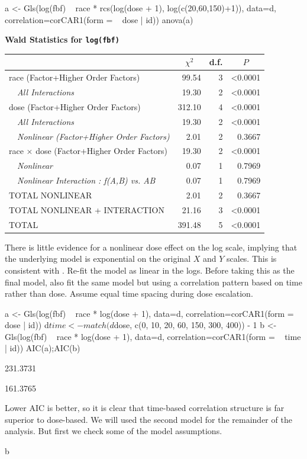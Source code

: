 \begin{Sinput}
a <- Gls(log(fbf) ~ race * rcs(log(dose + 1), log(c(20,60,150)+1)), data=d,
         correlation=corCAR1(form = ~ dose | id))
anova(a)
\end{Sinput}
\textbf{\Needspace{2in}
Wald Statistics for \texttt{\smaller log(fbf)}}\begin{center}
\begin{tabular}{lrrr}
\hline\hline
\multicolumn{1}{l}{}&\multicolumn{1}{c}{$\chi^{2}$}&\multicolumn{1}{c}{d.f.}&\multicolumn{1}{c}{$P$}\tabularnewline
\hline
race  (Factor+Higher Order Factors)& 99.54&3&\textless 0.0001\tabularnewline
~~\emph{All Interactions}& 19.30&2&\textless 0.0001\tabularnewline
dose  (Factor+Higher Order Factors)&312.10&4&\textless 0.0001\tabularnewline
~~\emph{All Interactions}& 19.30&2&\textless 0.0001\tabularnewline
~~\emph{Nonlinear (Factor+Higher Order Factors)}&  2.01&2&0.3667\tabularnewline
race $\times$ dose  (Factor+Higher Order Factors)& 19.30&2&\textless 0.0001\tabularnewline
~~\emph{Nonlinear}&  0.07&1&0.7969\tabularnewline
~~\emph{Nonlinear Interaction : f(A,B) vs. AB}&  0.07&1&0.7969\tabularnewline
TOTAL NONLINEAR&  2.01&2&0.3667\tabularnewline
TOTAL NONLINEAR + INTERACTION& 21.16&3&\textless 0.0001\tabularnewline
TOTAL&391.48&5&\textless 0.0001\tabularnewline
\hline
\end{tabular}\end{center}

There is little evidence for a nonlinear dose effect on the log scale, 
implying that the underlying model is exponential on the original $X$
and $Y$ scales.  This is consistent with \citet{dupmod}.  Re-fit the
model as linear in the logs.  Before taking this as the final model,
also fit the same model but using a correlation pattern based on time
rather than dose.  Assume equal time spacing during dose escalation. \ipacue
\begin{Schunk}
\begin{Sinput}
a <- Gls(log(fbf) ~ race * log(dose + 1), data=d,
         correlation=corCAR1(form = ~ dose | id))
d$time <- match(d$dose, c(0, 10, 20, 60, 150, 300, 400)) - 1
b <- Gls(log(fbf) ~ race * log(dose + 1), data=d,
         correlation=corCAR1(form = ~ time | id))
AIC(a);AIC(b)
\end{Sinput}
\begin{Soutput}
[1] 231.3731
\end{Soutput}
\begin{Soutput}
[1] 161.3765
\end{Soutput}
\end{Schunk}
Lower AIC is better, so it is clear that time-based correlation
structure is far superior to dose-based.  We will used the second
model for the remainder of the analysis.  But first we check some of
the model assumptions.
\begin{Sinput}
b
\end{Sinput}

